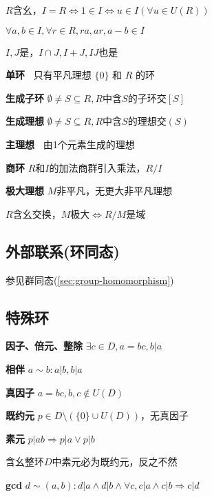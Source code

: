 \documentclass[a4paper,10pt]{ctexart}
\newcommand*{\impl}{\Rightarrow}
\renewcommand*{\iff}{\Leftrightarrow}
\newcommand*{\genring}[1]{[#1]}
\newcommand*{\genideal}[1]{(#1)}
\begin{document}
\begin{multicols}{3}
    $R$含幺，$I \! = \! R \iff 1 \!\in\! I \iff u \!\in\! I (\forall u \!\in\! U(R))$

    \begin{theorem}[理想判则]
        $\forall a, b \!\in\! I, \forall r \!\in\! R, ra, ar, a-b \in I$
    \end{theorem}

    \begin{theorem}[理想运算律]
        $I, J$是，$I \cap J, I + J, IJ$也是
    \end{theorem}

    \textbf{单环\ } 只有平凡理想 $\{0\}$ 和 $R$ 的环

    \textbf{生成子环} $\emptyset \!\neq\! S \!\subseteq\! R, R$中含$\!S\!$的子环交$\genring{S}$

    \textbf{生成理想} $\emptyset \!\neq\! S \!\subseteq\! R, R$中含$\!S\!$的理想交$\genideal{S}$

    \textbf{主理想\ } 由1个元素生成的理想

    \textbf{商环} $R$和$I$的加法商群引入乘法，$R/I$

    \textbf{极大理想} $M$非平凡，无更大非平凡理想

    $R$含幺交换，$M$极大$\iff R/M$是域

    \subsection{外部联系(环同态)}

    参见群同态(\ref{sec:group-homomorphism})

    \subsection{特殊环}

    \textbf{因子、倍元、整除} $\exists c \in D, a = bc, b | a$

    \textbf{相伴} $a \sim b: a | b, b | a$

    \textbf{真因子} $a = bc, b, c \notin U(D)$

    \textbf{既约元} $p \in D \setminus (\{ 0 \} \cup U(D))$，无真因子

    \textbf{素元} $p | ab \impl p | a \vee p | b$

    含幺整环$D$中素元必为既约元，反之不然

    \textbf{gcd} $d \sim (a, b): d|a \wedge d|b \wedge \forall c, c|a \wedge c|b \impl c|d$

    \begin{theorem}[gcd性质]
        \hfil


\end{theorem}
\end{multicols}
\end{document}
